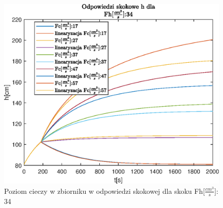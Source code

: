 \begin{figure}[h!]
   \centering
   \includegraphics{img/step-responses/h/stepResponseHFh34.eps}
   \caption{Poziom cieczy w zbiorniku w odpowiedzi skokowej dla skoku Fh[$\frac{cm^3}{s}$]: 34}
   \label{fig:stepResponseHFh34}
\end{figure}
            
